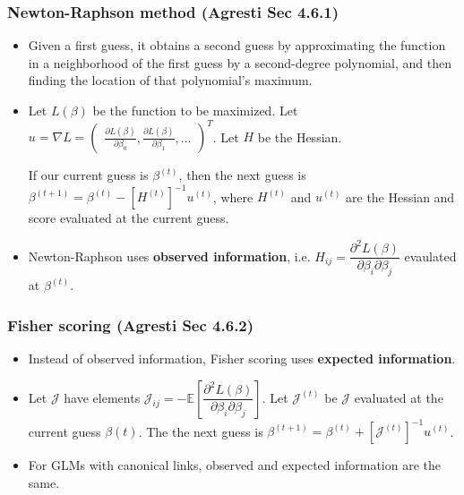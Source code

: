 \documentclass[twoside]{article}
\newcommand\bbE{\mathbb{E}}
\newcommand\calJ{\mathcal{J}}
\begin{document}
\subsubsection*{Newton-Raphson method (Agresti Sec 4.6.1)}
\begin{itemize}
\item Given a first guess, it obtains a second guess by approximating the function in a neighborhood of the first guess by a second-degree polynomial, and then finding the location of that polynomial's maximum.

\item Let $L(\beta)$ be the function to be maximized. Let $u = \nabla L = \begin{pmatrix} \frac{\partial L(\beta)}{\partial \beta_0}, \frac{\partial L(\beta)}{\partial \beta_1}, \dots \end{pmatrix}^T$. Let $H$ be the Hessian.

If our current guess is $\beta^{(t)}$, then the next guess is $\beta^{(t+1)} = \beta^{(t)} - \left[ H^{(t)}\right]^{-1} u^{(t)}$, where $H^{(t)}$ and $u^{(t)}$ are the Hessian and score evaluated at the current guess.

\item Newton-Raphson uses \textbf{observed information}, i.e. $H_{ij} = \dfrac{\partial^2 L(\beta)}{\partial \beta_i \partial \beta_j}$ evaulated at $\beta^{(t)}$.
\end{itemize}

\subsubsection*{Fisher scoring (Agresti Sec 4.6.2)}
\begin{itemize}
\item Instead of observed information, Fisher scoring uses \textbf{expected information}.

\item Let $\calJ$ have elements $\calJ_{ij} = -\bbE \left[ \dfrac{\partial^2 L(\beta)}{\partial \beta_i \partial \beta_j} \right]$. Let $\calJ^{(t)}$ be $\calJ$ evaluated at the current guess $\beta{(t)}$. The the next guess is $\beta^{(t+1)} = \beta^{(t)} + \left[\calJ^{(t)} \right]^{-1} u^{(t)}$.

\item For GLMs with canonical links, observed and expected information are the same. 
\end{itemize}
\end{document}
